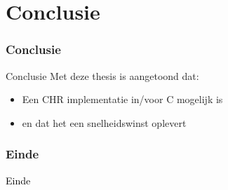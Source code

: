 \documentclass{beamer}
\newcommand{\cFront}[1]{\textcolor{black}{#1}}
\begin{document}
\section{Conclusie}

\begin{frame}
  \frametitle{Conclusie}
  \begin{block}{Conclusie}
    Met deze thesis is aangetoond dat:
    \begin{itemize}
      \item Een CHR implementatie in/voor C mogelijk is
      \item en dat het een snelheidswinst oplevert
    \end{itemize}
  \end{block}
\end{frame}

\begin{frame}
  \frametitle{Einde}
  \cFront{Einde}
\end{frame}
\end{document}

